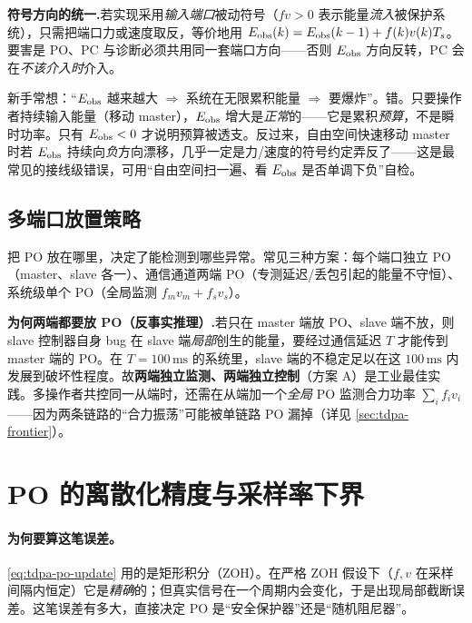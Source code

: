 \begin{note}
\textbf{符号方向的统一.}\;若实现采用\emph{输入端口}被动符号（$fv>0$ 表示能量\emph{流入}被保护系统），只需把端口力或速度取反，等价地用 $E_{\rm obs}(k)=E_{\rm obs}(k-1)+f(k)v(k)T_s$。要害是 PO、PC 与诊断必须共用同一套端口方向——否则 $E_{\rm obs}$ 方向反转，PC 会在\emph{不该介入时}介入。
\end{note}

\begin{pitfall}[误把累积量当瞬时量]
新手常想：“$E_{\rm obs}$ 越来越大 $\Rightarrow$ 系统在无限累积能量 $\Rightarrow$ 要爆炸”。错。只要操作者持续输入能量（移动 master），$E_{\rm obs}$ 增大是\emph{正常}的——它是累积\emph{预算}，不是瞬时功率。只有 $E_{\rm obs}<0$ 才说明预算被透支。反过来，自由空间快速移动 master 时若 $E_{\rm obs}$ 持续向\emph{负}方向漂移，几乎一定是力/速度的符号约定弄反了——这是最常见的接线级错误，可用“自由空间扫一遍、看 $E_{\rm obs}$ 是否单调下负”自检。
\end{pitfall}

\subsection{多端口放置策略}
\label{sec:tdpa-po-placement}

把 PO 放在哪里，决定了能检测到哪些异常。常见三种方案：每个端口独立 PO（master、slave 各一）、通信通道两端 PO（专测延迟/丢包引起的能量不守恒）、系统级单个 PO（全局监测 $f_m v_m+f_s v_s$）。

\begin{insight}
\textbf{为何两端都要放 PO（反事实推理）.}\;若只在 master 端放 PO、slave 端不放，则 slave 控制器自身 bug 在 slave 端\emph{局部}创生的能量，要经过通信延迟 $T$ 才能传到 master 端的 PO。在 $T=100\,\mathrm{ms}$ 的系统里，slave 端的不稳定足以在这 $100\,\mathrm{ms}$ 内发展到破坏性程度。故\textbf{两端独立监测、两端独立控制}（方案 A）是工业最佳实践。多操作者共控同一从端时，还需在从端加一个\emph{全局} PO 监测合力功率 $\sum_i f_i v_i$——因为两条链路的“合力振荡”可能被单链路 PO 漏掉（详见 \cref{sec:tdpa-frontier}）。
\end{insight}

\section{PO 的离散化精度与采样率下界}
\label{sec:tdpa-accuracy}

\paragraph{为何要算这笔误差。}
\cref{eq:tdpa-po-update} 用的是矩形积分（ZOH）。在严格 ZOH 假设下（$f,v$ 在采样间隔内恒定）它是\emph{精确}的；但真实信号在一个周期内会变化，于是出现局部截断误差。这笔误差有多大，直接决定 PO 是“安全保护器”还是“随机阻尼器”。

